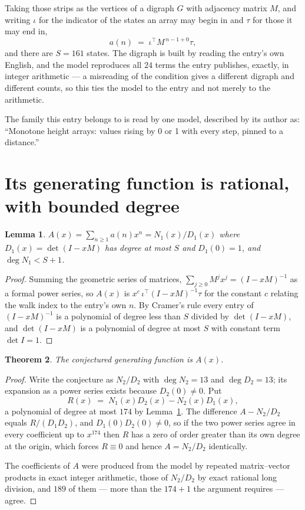 \documentclass[11pt,a4paper]{article}
\theoremstyle{plain}
\newtheorem{theorem}{Theorem}
\newtheorem{lemma}[theorem]{Lemma}
\theoremstyle{definition}
\begin{document}
Taking those strips as the vertices of a digraph $G$ with adjacency matrix $M$, and writing
$\iota$ for the indicator of the states an array may begin in and $\tau$ for those it may end
in,
\[
a(n)\;=\;\iota^{\!\top}M^{\,n-1+0}\tau ,
\]
and there are $S=161$ states. The digraph is built by reading the entry's own English, and the
model reproduces all $24$ terms the entry publishes, exactly, in integer arithmetic --- a
misreading of the condition gives a different digraph and different counts, so this ties the
model to the entry and not merely to the arithmetic.

The family this entry belongs to is read by one model, described by its author as: ``Monotone height arrays: values rising by 0 or 1 with every step, pinned to a distance.''


\section{Its generating function is rational, with bounded degree}

\begin{lemma}\label{lem:rat}
$A(x)=\sum_{n\ge1}a(n)x^n=N_1(x)/D_1(x)$ where $D_1(x)=\det(I-xM)$ has degree at most
$S$ and $D_1(0)=1$, and $\deg N_1<S+1$.
\end{lemma}

\begin{proof}
Summing the geometric series of matrices, $\sum_{j\ge0}M^jx^j=(I-xM)^{-1}$ as a formal
power series, so $A(x)$ is $x^{c}\,\iota^{\!\top}(I-xM)^{-1}\tau$ for the constant $c$
relating the walk index to the entry's own $n$. By Cramer's rule every entry of
$(I-xM)^{-1}$ is a polynomial of degree less than $S$ divided by $\det(I-xM)$, and
$\det(I-xM)$ is a polynomial of degree at most $S$ with constant term $\det I=1$.
\end{proof}

\begin{theorem}
The conjectured generating function is $A(x)$.
\end{theorem}

\begin{proof}
Write the conjecture as $N_2/D_2$ with $\deg N_2=13$ and $\deg D_2=13$; its expansion as a
power series exists because $D_2(0)\neq0$. Put
\[
R(x)\;=\;N_1(x)D_2(x)-N_2(x)D_1(x),
\]
a polynomial of degree at most $174$ by Lemma~\ref{lem:rat}. The difference
$A-N_2/D_2$ equals $R/(D_1D_2)$, and $D_1(0)D_2(0)\neq0$, so if the two power series agree in
every coefficient up to $x^{174}$ then $R$ has a zero of order greater than its own
degree at the origin, which forces $R\equiv0$ and hence $A=N_2/D_2$ identically.

The coefficients of $A$ were produced from the model by repeated matrix--vector products in
exact integer arithmetic, those of $N_2/D_2$ by exact rational long division, and $189$
of them --- more than the $174+1$ the argument requires --- agree.
\end{proof}
\end{document}
